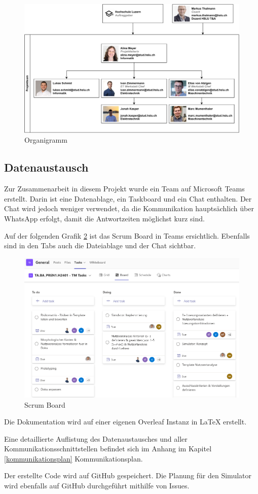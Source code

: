 \begin{figure}[H]
\centering
\includegraphics[width=\textwidth]{img/Projektorganisation.pdf}
\caption{Organigramm}
\label{fig:Organigramm}
\end{figure}

\subsection{Datenaustausch}

Zur Zusammenarbeit in diesem Projekt wurde ein Team auf Microsoft Teams erstellt.
Darin ist eine Datenablage, ein Taskboard und ein Chat enthalten. Der Chat wird jedoch weniger verwendet, da die Kommunikation hauptsächlich über WhatsApp erfolgt, damit die Antwortzeiten möglichst kurz sind.

Auf der folgenden Grafik \ref{fig:scrum-board} ist das Scrum Board in Teams ersichtlich. Ebenfalls sind in den Tabs auch die Dateiablage und der Chat sichtbar.

\begin{figure}[H]
\centering
\includegraphics[width=\textwidth]{img/scrum-board.png}
\caption{Scrum Board}
\label{fig:scrum-board}
\end{figure}

Die Dokumentation wird auf einer eigenen Overleaf Instanz in LaTeX erstellt.

Eine detaillierte Auflistung des Datenaustausches und aller Kommunikationsschnittstellen befindet sich im Anhang im Kapitel \ref{kommunikationsplan} Kommunikationsplan.

Der erstellte Code wird auf GitHub gespeichert. Die Planung für den Simulator wird ebenfalls auf GitHub durchgeführt mithilfe von Issues.

